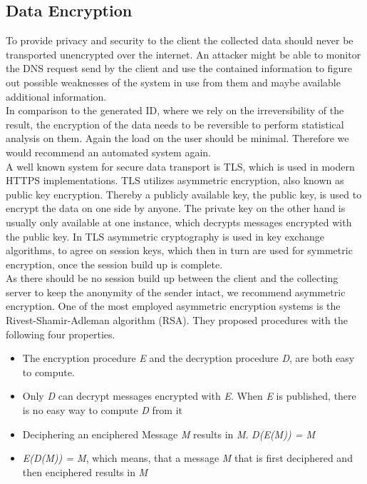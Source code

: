     \subsection{Data Encryption}
        \label{subsec:software_design:encryption}
        To provide privacy and security to the client the collected data should never be transported unencrypted over the internet. An attacker might be able to monitor the DNS request send by the client and use the contained information to figure out possible weaknesses of the system in use from them and maybe available additional information. \\
        In comparison to the generated ID, where we rely on the irreversibility of the result, the encryption of the data needs to be reversible to perform statistical analysis on them.
        Again the load on the user should be minimal. Therefore we would recommend an automated system again.\\
        A well known system for secure data transport is TLS, which is used in modern HTTPS implementations. TLS utilizes asymmetric encryption, also known as public key encryption. 
        Thereby a publicly available key, the public key, is used to encrypt the data on one side by anyone. The private key on the other hand is usually only available at one instance, which decrypts messages encrypted with the public key. In TLS asymmetric cryptography is used in key exchange algorithms, to agree on session keys, which then in turn are used for symmetric encryption, once the session build up is complete\cite{noauthor_how_nodate}.\\
        As there should be no session build up between the client and the collecting server to keep the anonymity of the sender intact, we recommend asymmetric encryption.
        One of the most employed asymmetric encryption systems is the Rivest-Shamir-Adleman algorithm (RSA). They proposed procedures with the following four properties\cite{rivest_method_1978}.
        \begin{itemize}
            \item The encryption procedure \textit{E} and the decryption procedure \textit{D}, are both easy to compute.
            \item Only \textit{D} can decrypt messages encrypted with \textit{E}. When \textit{E} is published, there is no easy way to compute \textit{D} from it
            \item Deciphering an enciphered Message \textit{M} results in \textit{M}. \textit{D(E(M)) = M}
            \item \textit{E(D(M)) = M}, which means, that a message \textit{M} that is first deciphered and then enciphered results in \textit{M}
        \end{itemize}
